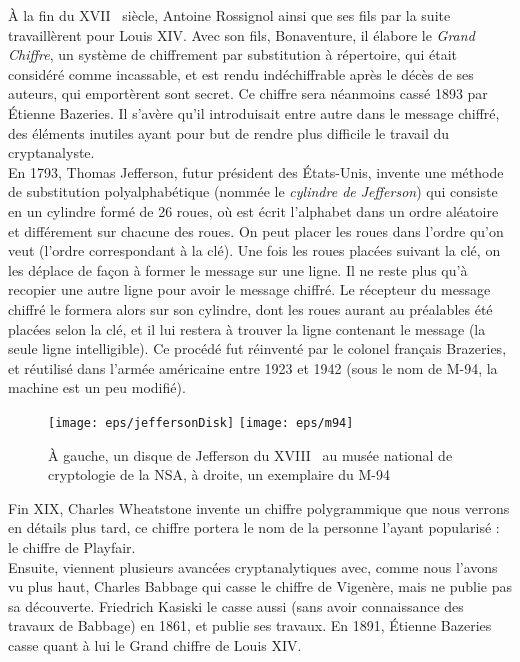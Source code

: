 À la fin du XVII\ieme~ siècle, Antoine Rossignol ainsi que ses
fils par la suite travaillèrent pour Louis XIV. Avec son fils,
Bonaventure, il élabore le \emph{Grand Chiffre}, un système de
chiffrement par substitution à répertoire, qui était considéré comme
incassable, et est rendu indéchiffrable après le décès de ses auteurs,
qui emportèrent sont secret. Ce chiffre sera néanmoins cassé 1893 par
Étienne Bazeries. Il s'avère qu'il introduisait entre autre
dans le message chiffré, des éléments inutiles ayant pour but de
rendre plus difficile le travail du cryptanalyste.\\

En 1793, Thomas Jefferson, futur président des États-Unis,
invente une méthode de substitution polyalphabétique (nommée le
\emph{cylindre de Jefferson}) qui consiste en
un cylindre formé de 26 roues, où est écrit l'alphabet dans un ordre
aléatoire et différement sur chacune des roues. On peut placer les
roues dans l'ordre qu'on veut (l'ordre correspondant à la clé).
Une fois les roues placées suivant la clé, on les déplace de façon à
former le message sur une ligne. Il ne reste plus qu'à recopier une
autre ligne pour avoir le message chiffré. Le récepteur du message
chiffré le formera alors sur son cylindre, dont les roues aurant au
préalables été placées selon la clé, et il lui restera à trouver la
ligne contenant le message (la seule ligne intelligible). Ce procédé
fut réinventé par le colonel français Brazeries, et réutilisé
dans l'armée américaine entre 1923 et 1942 (sous le nom de M-94, la
machine est un peu modifié).

\begin{figure}[h]
  \begin{center}
    \texttt{[image: eps/jeffersonDisk]}
    \hfill
    \texttt{[image: eps/m94]}
  \end{center}
  \caption{À gauche, un disque de Jefferson du XVIII\ieme~ au musée
    national de cryptologie de la NSA, 
    à droite, un exemplaire du M-94}
  \label{fig:JeffersonDisk}
\end{figure}

Fin XIX\ieme, Charles Wheatstone invente un chiffre
polygrammique que nous verrons en détails plus tard, ce chiffre
portera le nom de la personne l'ayant popularisé : le chiffre
  de Playfair. \\

Ensuite, viennent plusieurs avancées cryptanalytiques avec, comme nous
l'avons vu plus haut, Charles Babbage qui casse le chiffre de
Vigenère, mais ne publie pas sa découverte. Friedrich Kasiski
le casse aussi (sans avoir connaissance des travaux de
Babbage) en 1861, et publie ses travaux. En 1891, Étienne
  Bazeries casse quant à lui le Grand chiffre de Louis XIV. 

